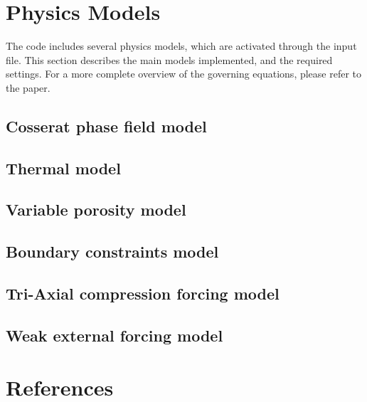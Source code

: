 \documentclass[3p]{elsarticle} %
\begin{document}
\section{Physics Models}
The code includes several physics models, which are activated through the input file. This section describes the main models implemented, and the required settings. For a more complete overview of the governing equations, please refer to the paper.

\subsection{Cosserat phase field model}

\subsection{Thermal model}

\subsection{Variable porosity model}

\subsection{Boundary constraints model}

\subsection{Tri-Axial compression forcing model}

\subsection{Weak external forcing model}









\FloatBarrier
\section{References}
\renewcommand{\bibsection}{}

\end{document}
